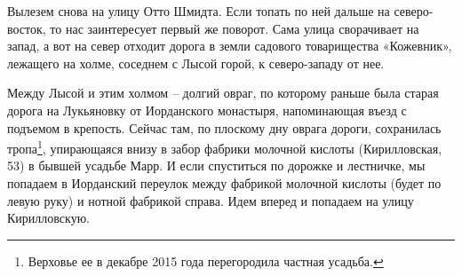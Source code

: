 Вылезем снова на улицу Отто Шмидта. Если топать по ней дальше на северо-восток, то нас заинтересует первый же поворот. Сама улица сворачивает на запад, а вот на север отходит дорога в земли садового товарищества «Кожевник», лежащего на холме, соседнем с Лысой горой, к северо-западу от нее. 

Между Лысой и этим холмом – долгий овраг, по которому раньше была старая дорога на Лукьяновку от Иорданского монастыря, напоминающая въезд с подъемом в крепость. Сейчас там, по плоскому дну оврага дороги, сохранилась тропа\footnote{Верховье ее в декабре 2015 года перегородила частная усадьба.}, упирающаяся внизу в забор фабрики молочной кислоты (Кирилловская, 53) в бывшей усадьбе Марр. И если спуститься по дорожке и лестничке, мы попадаем в Иорданский переулок между фабрикой молочной кислоты (будет по левую руку) и нотной фабрикой справа. Идем вперед и попадаем на улицу Кирилловскую.
